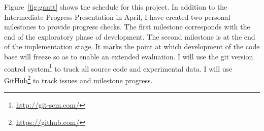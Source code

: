 Figure~\ref{fig:gantt} shows the schedule for this project. In
addition to the Intermediate Progress Presentation in April, I have
created two personal milestones to provide progress checks. The first
milestone corresponds with the end of the exploratory phase of
development. The second milestone is at the end of the implementation
stage. It marks the point at which development of the code base will
freeze so as to enable an extended evaluation. I will use the git
version control system\footnote{\url{http://git-scm.com/}} to track
all source code and experimental data. I will use
GitHub\footnote{\url{https://github.com/}} to track issues and
milestone progress.
